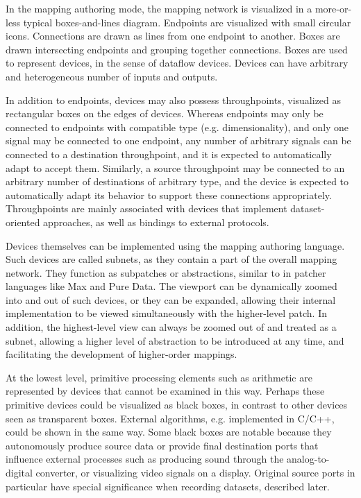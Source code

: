 \documentclass[main.tex]{subfiles}
\begin{document}
In the mapping authoring mode, the mapping network is visualized in a more-or-less typical
boxes-and-lines diagram. Endpoints are visualized with small circular icons. Connections
are drawn as lines from one endpoint to another. Boxes are drawn intersecting endpoints
and grouping together connections. Boxes are used to represent devices, in the sense of
dataflow devices. Devices can have arbitrary and heterogeneous number of inputs
and outputs.

In addition to endpoints, devices may also possess throughpoints, visualized
as rectangular boxes on the edges of devices. Whereas endpoints may only
be connected to endpoints with compatible type (e.g. dimensionality), and only one
signal may be connected to one endpoint, any number of arbitrary signals can be connected
to a destination throughpoint, and it is expected to automatically adapt to accept them.
Similarly, a source throughpoint may be connected to an arbitrary number of destinations
of arbitrary type, and the device is expected to automatically adapt its behavior
to support these connections appropriately. Throughpoints are mainly associated
with devices that implement dataset-oriented approaches, as well as bindings to external
protocols.

Devices themselves can be implemented using the mapping authoring language. Such devices are
called subnets, as they contain a part of the overall mapping network. They function as subpatches
or abstractions, similar to in patcher languages like Max and Pure Data. The viewport
can be dynamically zoomed into and out of such devices, or they can be expanded, allowing
their internal implementation to be viewed simultaneously with the higher-level patch.
In addition, the highest-level view can always be zoomed out of and treated as a subnet,
allowing a higher level of abstraction to be introduced at any time, and facilitating the
development of higher-order mappings.

At the lowest level, primitive processing elements such as arithmetic are
represented by devices that cannot be examined in this way. Perhaps these
primitive devices could be visualized as black boxes, in contrast to other
devices seen as transparent boxes. External algorithms, e.g. implemented in
C/C++, could be shown in the same way. Some black boxes are notable because
they autonomously produce source data or provide final destination ports that
influence external processes such as producing sound through the
analog-to-digital converter, or visualizing video signals on a display.
Original source ports in particular have special significance when recording
datasets, described later.
\end{document}
